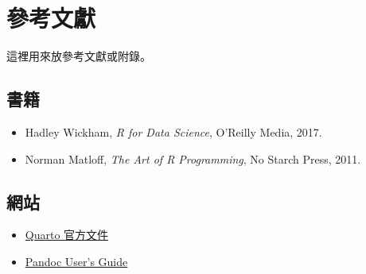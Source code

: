 \documentclass[
  chinese,
  11pt,
  a4paper,
]{book}
\providecommand{\tightlist}{%
  \setlength{\itemsep}{0pt}\setlength{\parskip}{0pt}}
\begin{document}

\chapter*{參考文獻}\label{ux53c3ux8003ux6587ux737b}


這裡用來放參考文獻或附錄。

\section*{書籍}\label{ux66f8ux7c4d}


\begin{itemize}
\tightlist
\item
  Hadley Wickham, \emph{R for Data Science}, O'Reilly Media, 2017.
\item
  Norman Matloff, \emph{The Art of R Programming}, No Starch Press,
  2011.
\end{itemize}

\section*{網站}\label{ux7db2ux7ad9}


\begin{itemize}
\tightlist
\item
  \href{https://quarto.org}{Quarto 官方文件}
\item
  \href{https://pandoc.org/MANUAL.html}{Pandoc User's Guide}
\end{itemize}


\backmatter
\end{document}
